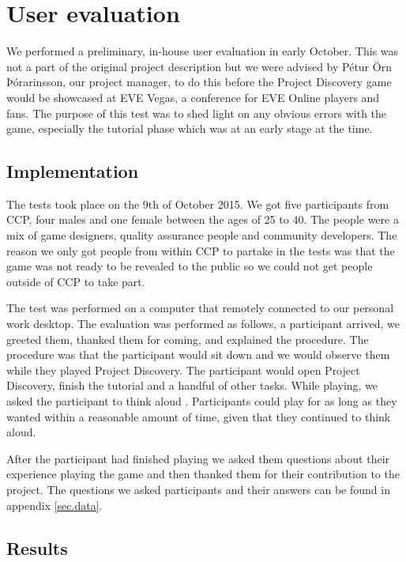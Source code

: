 \section{User evaluation}\label{sec:userevaluation}

We performed a preliminary, in-house user evaluation in early October. This was not a part of the original project description but we were advised by Pétur Örn Þórarinsson, our project manager, to do this before the Project Discovery game would be showcased at EVE Vegas, a conference for EVE Online players and fans. The purpose of this test was to shed light on any obvious errors with the game, especially the tutorial phase which was at an early stage at the time.

\subsection{Implementation}
The tests took place on the 9th of October 2015. We got five participants from CCP, four males and one female between the ages of 25 to 40. The people were a mix of game designers, quality assurance people and community developers. The reason we only got people from within CCP to partake in the tests was that the game was not ready to be revealed to the public so we could not get people outside of CCP to take part.

The test was performed on a computer that remotely connected to our personal work desktop. The evaluation was performed as follows, a participant arrived, we greeted them, thanked them for coming, and explained the procedure. The procedure was that the participant would sit down and we would observe them while they played Project Discovery. The participant would open Project Discovery, finish the tutorial and a handful of other tasks. While playing, we asked the participant to think aloud . Participants could play for as long as they wanted within a reasonable amount of time, given that they continued to think aloud.

After the participant had finished playing we asked them questions about their experience playing the game and then thanked them for their contribution to the project. The questions we asked participants and their answers can be found in appendix \ref{sec.data}.

\subsection{Results}

